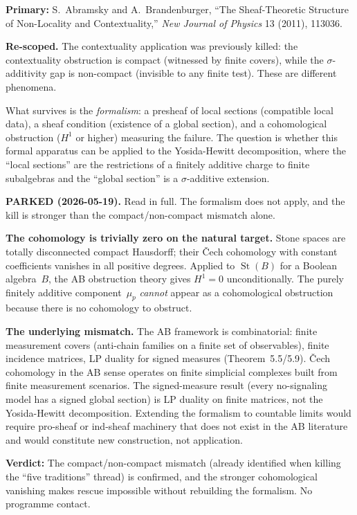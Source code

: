 \noindent\textbf{Primary:} S.~Abramsky and A.~Brandenburger, ``The
Sheaf-Theoretic Structure of Non-Locality and Contextuality,''
\emph{New Journal of Physics} 13 (2011), 113036.

\medskip\noindent
\textbf{Re-scoped.}  The contextuality application was previously
killed: the contextuality obstruction is compact (witnessed by finite
covers), while the $\sigma$-additivity gap is non-compact (invisible
to any finite test).  These are different phenomena.

What survives is the \emph{formalism}: a presheaf of local sections
(compatible local data), a sheaf condition (existence of a global
section), and a cohomological obstruction ($H^1$ or higher) measuring
the failure.  The question is whether this formal apparatus can be
applied to the Yosida-Hewitt decomposition, where the ``local
sections'' are the restrictions of a finitely additive charge to
finite subalgebras and the ``global section'' is a $\sigma$-additive
extension.

\medskip\noindent\textbf{PARKED (2026-05-19).}  Read in full.  The
formalism does not apply, and the kill is stronger than the
compact/non-compact mismatch alone.

\textbf{The cohomology is trivially zero on the natural target.}
Stone spaces are totally disconnected compact Hausdorff; their
\v{C}ech cohomology with constant coefficients vanishes in all
positive degrees.  Applied to $\operatorname{St}(B)$ for a Boolean
algebra~$B$, the AB obstruction theory gives $H^1 = 0$
unconditionally.  The purely finitely additive component~$\mu_p$
\emph{cannot} appear as a cohomological obstruction because there is
no cohomology to obstruct.

\textbf{The underlying mismatch.}  The AB framework is
combinatorial: finite measurement covers (anti-chain families on a
finite set of observables), finite incidence matrices, LP duality for
signed measures (Theorem~5.5/5.9).  \v{C}ech cohomology in the AB
sense operates on finite simplicial complexes built from finite
measurement scenarios.  The signed-measure result (every no-signaling
model has a signed global section) is LP duality on finite matrices,
not the Yosida-Hewitt decomposition.  Extending the formalism to
countable limits would require pro-sheaf or ind-sheaf machinery that
does not exist in the AB literature and would constitute new
construction, not application.

\textbf{Verdict:} The compact/non-compact mismatch (already
identified when killing the ``five traditions'' thread) is confirmed,
and the stronger cohomological vanishing makes rescue impossible
without rebuilding the formalism.  No programme contact.

